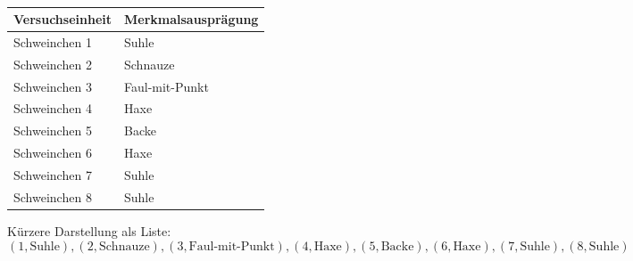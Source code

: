 \begin{bsp}
     \\
    \begin{mytable}
        \begin{tabular}{ll}
            \hline
            \textbf{Versuchseinheit} & \textbf{Merkmalsausprägung} \\
            \hline
            Schweinchen 1            & Suhle                       \\
            Schweinchen 2            & Schnauze                    \\
            Schweinchen 3            & Faul-mit-Punkt              \\
            Schweinchen 4            & Haxe                        \\
            Schweinchen 5            & Backe                       \\
            Schweinchen 6            & Haxe                        \\
            Schweinchen 7            & Suhle                       \\
            Schweinchen 8            & Suhle                       \\
            \hline
        \end{tabular}
    \end{mytable}

    Kürzere Darstellung als Liste:
    \[
        (1,\text{Suhle}),(2,\text{Schnauze}),(3,\text{Faul-mit-Punkt}),(4,\text{Haxe}),(5,\text{Backe}),(6,\text{Haxe}),(7,\text{Suhle}),(8,\text{Suhle})
    \]
\end{bsp}

